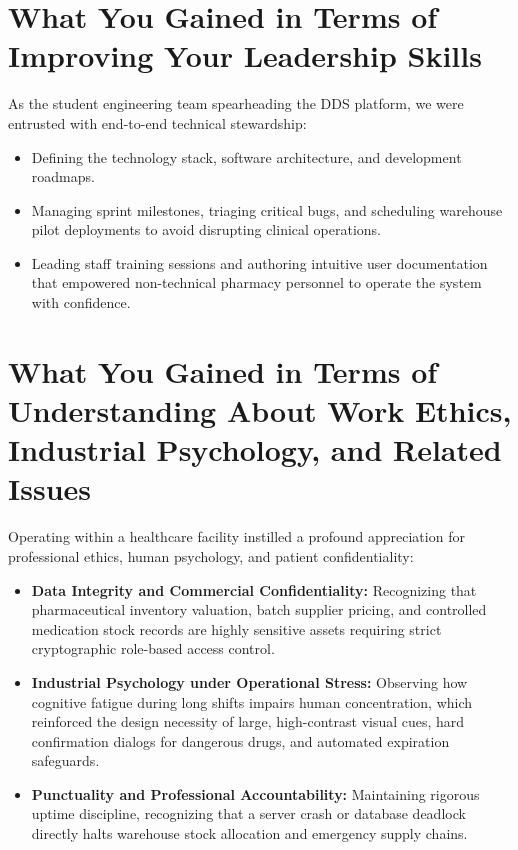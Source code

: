 \section{What You Gained in Terms of Improving Your Leadership Skills}
As the student engineering team spearheading the DDS platform, we were entrusted with end-to-end technical stewardship:
\begin{itemize}
    \item Defining the technology stack, software architecture, and development roadmaps.
    \item Managing sprint milestones, triaging critical bugs, and scheduling warehouse pilot deployments to avoid disrupting clinical operations.
    \item Leading staff training sessions and authoring intuitive user documentation that empowered non-technical pharmacy personnel to operate the system with confidence.
\end{itemize}

\section{What You Gained in Terms of Understanding About Work Ethics, Industrial Psychology, and Related Issues}
Operating within a healthcare facility instilled a profound appreciation for professional ethics, human psychology, and patient confidentiality:
\begin{itemize}
    \item \textbf{Data Integrity and Commercial Confidentiality:} Recognizing that pharmaceutical inventory valuation, batch supplier pricing, and controlled medication stock records are highly sensitive assets requiring strict cryptographic role-based access control.
    \item \textbf{Industrial Psychology under Operational Stress:} Observing how cognitive fatigue during long shifts impairs human concentration, which reinforced the design necessity of large, high-contrast visual cues, hard confirmation dialogs for dangerous drugs, and automated expiration safeguards.
    \item \textbf{Punctuality and Professional Accountability:} Maintaining rigorous uptime discipline, recognizing that a server crash or database deadlock directly halts warehouse stock allocation and emergency supply chains.
\end{itemize}


